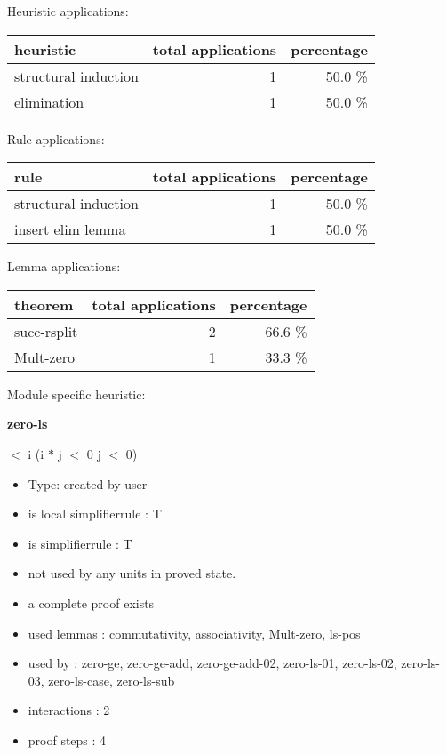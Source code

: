 \documentclass[a4paper]{article}
\begin{document}
\medskip


Heuristic applications:

\begin{supertabular}{l|r|r}
heuristic	& total applications & percentage \\ \hline
structural induction & 1 & 50.0 \% \\
elimination & 1 & 50.0 \% \\

\end{supertabular}

Rule applications:

\begin{supertabular}{l|r|r}
rule	        & total applications & percentage \\ \hline
structural induction & 1 & 50.0 \% \\
insert elim lemma & 1 & 50.0 \% \\

\end{supertabular}

Lemma applications:

\begin{supertabular}{l|r|r}
theorem	        & total applications & percentage \\ \hline
succ-rsplit & 2 & 66.6 \% \\
Mult-zero & 1 & 33.3 \% \\

\end{supertabular}

Module specific heuristic:

\pagebreak

{\LARGE\bf zero-ls}\label{lemma-zero-ls}

\medskip

  $<$ i \Imp (i $*$ j $<$ 0 \Equiv j $<$ 0)

\begin{itemize}

\item Type: created by user

\item is local simplifierrule : T
\item is simplifierrule : T
\item not used by any units in proved state.
\item       a complete proof exists
\item       used lemmas  : commutativity, associativity, Mult-zero, ls-pos
\item       used by      : zero-ge, zero-ge-add, zero-ge-add-02, zero-ls-01, zero-ls-02, zero-ls-03, zero-ls-case, zero-ls-sub
\item       interactions : 2
\item       proof steps  : 4
\end{itemize}
\end{document}
